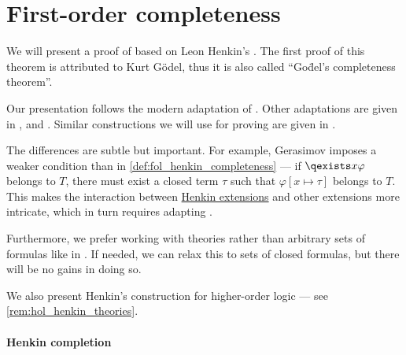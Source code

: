 \section{First-order completeness}\label{sec:first_order_completeness}

\begin{remark}\label{rem:fol_henkin_theories}
   We will present a proof of  based on Leon Henkin's \cite{Henkin1949FOLCompleteness}. The first proof of this theorem is attributed to Kurt G\"odel, thus it is also called \enquote{Go\"del's completeness theorem}.

   Our presentation follows the modern adaptation of \textcite[\S 3.1]{VanDalen2004LogicAndStructure}. Other adaptations are given in \cite[\S 4.2]{Shoenfield1967MathematicalLogic}, \cite[\S 4.5]{ШеньВерещагин2017ЯзыкиИИсчисления} and \cite[\S 2.6.3]{Герасимов2014Вычислимость}. Similar constructions we will use for proving  are given in \cite[ch. 3]{Hinman2005Logic}.

   The differences are subtle but important. For example, Gerasimov imposes a weaker condition than in \cref{def:fol_henkin_completeness} --- if \( \qexists x \varphi \) belongs to \( T \), there must exist a closed term \( \tau \) such that \( \varphi[x \mapsto \tau] \) belongs to \( T \). This makes the interaction between \hyperref[def:fol_henkin_extension]{Henkin extensions} and other extensions more intricate, which in turn requires adapting .

   Furthermore, we prefer working with theories rather than arbitrary sets of formulas like in . If needed, we can relax this to sets of closed formulas, but there will be no gains in doing so.

   We also present Henkin's construction for higher-order logic --- see \cref{rem:hol_henkin_theories}.
\end{remark}

\paragraph{Henkin completion}

